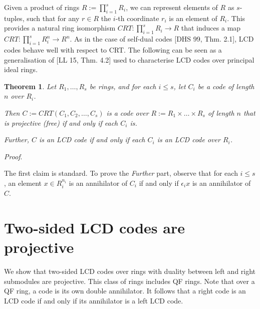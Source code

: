 \documentclass{article}
\theoremstyle{plain}
\newtheorem{Thm}[veta]{Theorem}
\theoremstyle{plain}
\theoremstyle{remark}
\theoremstyle{plain}
\newenvironment{dukaz}{
  \par\medskip \noindent
  \textit{Proof}.
}{

\rightline{$\qedsymbol$}
}
\begin{document}
Given a product of rings $R:=\prod^s_{i=1} R_i$, we can represent elements of $R$ as $s$-tuples, such that for any $r\in R$ the $i$-th coordinate $r_i$ is an element of $R_i$. This provides a natural ring isomorphism $CRT\colon \prod^s_{i=1} R_i\to R$ that induces a map $CRT\colon \prod^s_{i=1} R^n_i\to R^n$. As in the case of self-dual codes [DHS 99, Thm. 2.1], LCD codes behave well with respect to CRT. The following can be seen as a generalisation of [LL 15, Thm. 4.2]  used to characterise LCD codes over principal ideal rings.
\begin{Thm}\label{ThmCRTLCD} Let $R_1, \dots, R_s$ be rings, and for each $i\leq s$, let $C_i$ be a code of length $n$ over $R_i$.

    Then $C:=CRT(C_1, C_2, \dots, C_s)$ is a code over $R:=R_1\times \dots \times R_s$  of length $n$ that is projective  (free) if and only if each $C_i$ is.
    
   Further, $C$ is an LCD code if and only if each $C_i$ is an LCD code over $R_i$. 
\end{Thm}
\begin{dukaz}
    The first claim is standard. To prove the \textit{Further} part, observe that for each $i\leq s$, an element $x\in R_i^{n_i}$ is an annihilator of $C_i$ if and only if $\epsilon _ix$ is an annihilator of $C$. 
\end{dukaz}



\section{Two-sided LCD codes are projective}\label{SecTwo-Sided}

We show that two-sided LCD codes over rings with duality between left and right submodules are projective. This class of rings includes QF rings. Note that over a QF ring, a code is its own double annihilator. It follows that a right code is an LCD code if and only if its annihilator is a left LCD code.






\medskip 
\end{document}
